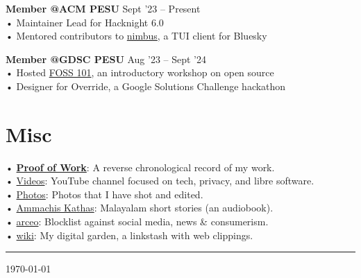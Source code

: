 \documentclass[a4,12pt]{article}
\begin{document}
\textbf{Member @ACM PESU} \hfill Sept '23 – Present \\
• Maintainer Lead for Hacknight 6.0 \\
• Mentored contributors to \href{https://github.com/polarhive/nimbus}{nimbus}, a TUI client for Bluesky

\textbf{Member @GDSC PESU} \hfill Aug '23 – Sept '24 \\
• Hosted \href{https://polarhive.net/talks/gdsc-foss-101/}{FOSS 101}, an introductory workshop on open source \\
• Designer for Override, a Google Solutions Challenge hackathon

\section{Misc}
• \textbf{\href{https://polarhive.net/pow}{Proof of Work}}: A reverse chronological record of my work. \\
• \href{https://polarhive.net/videos}{Videos}: YouTube channel focused on tech, privacy, and libre software.\\
• \href{https://polarhive.net/photos}{Photos}: Photos that I have shot and edited. \\
• \href{https://polarhive.net/ammachiskathas}{Ammachis Kathas}: Malayalam short stories (an audiobook). \\
• \href{https://polarhive.net/arceo}{arceo}: Blocklist against social media, news \& consumerism. \\
• \href{https://polarhive.net/wiki}{wiki}: My digital garden, a linkstash with web clippings.

\noindent\rule{\textwidth}{0.4pt}

\href{https://github.com/polarhive/resume}{} \today
\end{document}
